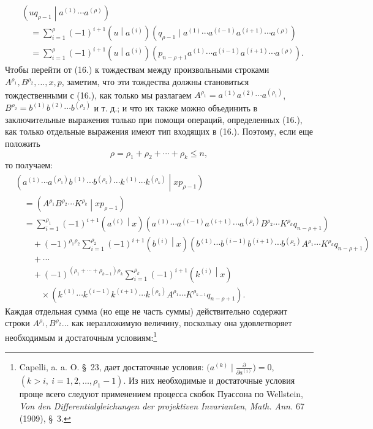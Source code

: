 \documentclass[11pt]{article}
\newcommand{\pair}[2]{\left(#1\middle|#2\right)}
\begin{document}
\begin{equation}
\begin{aligned}
&\pair{u q_{\rho-1}}{a^{(1)}\cdots a^{(\rho)}}\\
&\quad=\sum_{i=1}^{\rho}(-1)^{i+1}\pair{u}{a^{(i)}}
(q_{\rho-1}\mid a^{(1)}\cdots a^{(i-1)}a^{(i+1)}\cdots a^{(\rho)})\\
&\quad=\sum_{i=1}^{\rho}(-1)^{i+1}\pair{u}{a^{(i)}}
(p_{n-\rho+1}a^{(1)}\cdots a^{(i-1)}a^{(i+1)}\cdots a^{(\rho)}).
\end{aligned}
\tag{17}
\end{equation}
Чтобы перейти от (16.) к тождествам между произвольными строками $A^{\rho_1},B^{\rho_2},\ldots,x,p$, заметим, что эти тождества должны становиться тождественными с (16.), как только мы разлагаем $A^{\rho_1}=a^{(1)}a^{(2)}\cdots a^{(\rho_1)}$, $B^{\rho_2}=b^{(1)}b^{(2)}\cdots b^{(\rho_2)}$ и т. д.; и что их также можно объединить в заключительные выражения только при помощи операций, определенных (16.), как только отдельные выражения имеют тип входящих в (16.). Поэтому, если еще положить
\begin{equation}
 \rho=\rho_1+\rho_2+\cdots+\rho_k\le n,
\tag{18}
\end{equation}
то получаем:
\[
\begin{aligned}
&\pair{a^{(1)}\cdots a^{(\rho_1)}b^{(1)}\cdots b^{(\rho_2)}
\cdots k^{(1)}\cdots k^{(\rho_k)}}{xp_{\rho-1}}\\
&\quad=\pair{A^{\rho_1}B^{\rho_2}\cdots K^{\rho_k}}{xp_{\rho-1}} \\
&\quad=\sum_{i=1}^{\rho_1}(-1)^{i+1}\pair{a^{(i)}}{x}
(a^{(1)}\cdots a^{(i-1)}a^{(i+1)}\cdots a^{(\rho_1)}
B^{\rho_2}\cdots K^{\rho_k}q_{n-\rho+1})\\
&\qquad+(-1)^{\rho_1\rho_2}\sum_{i=1}^{\rho_2}(-1)^{i+1}\pair{b^{(i)}}{x}
(b^{(1)}\cdots b^{(i-1)}b^{(i+1)}\cdots b^{(\rho_2)}
A^{\rho_1}\cdots K^{\rho_k}q_{n-\rho+1})\\
&\qquad+\cdots\\
&\qquad+(-1)^{(\rho_1+\cdots+\rho_{k-1})\rho_k}
\sum_{i=1}^{\rho_k}(-1)^{i+1}\pair{k^{(i)}}{x}\\
&\qquad\quad\times
(k^{(1)}\cdots k^{(i-1)}k^{(i+1)}\cdots k^{(\rho_k)}
A^{\rho_1}\cdots K^{\rho_{k-1}}q_{n-\rho+1}).
\end{aligned}
\]
Каждая отдельная сумма (но еще не часть суммы) действительно содержит строки $A^{\rho_1},B^{\rho_2}\ldots$ как неразложимую величину, поскольку она удовлетворяет необходимым и достаточным условиям:\footnote{Capelli, a. a. O. \S\ 23, дает достаточные условия: $\bigl(a^{(k)}\mid \frac{\partial}{\partial a^{(i)}}\bigr)=0$, $(k>i,\ i=1,2,\ldots,\rho_1-1)$. Из них необходимые и достаточные условия проще всего следуют применением процесса скобок Пуассона по Wellstein, \emph{Von den Differentialgleichungen der projektiven Invarianten}, \emph{Math. Ann.} 67 (1909), \S\ 3.}
\end{document}
